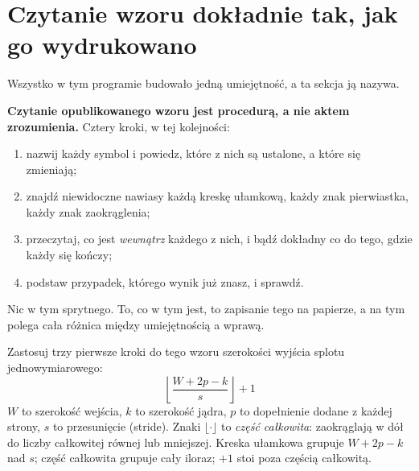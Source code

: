 \section{Czytanie wzoru dokładnie tak, jak go wydrukowano}
\label{sec:F02-reading}

\begin{fr}
Wszystko w tym programie budowało jedną umiejętność, a ta sekcja ją nazywa.

\textbf{Czytanie opublikowanego wzoru jest procedurą, a nie aktem
zrozumienia.} Cztery kroki, w tej kolejności:

\begin{enumerate}
\item nazwij każdy symbol i powiedz, które z nich są ustalone, a które się
  zmieniają;
\item znajdź niewidoczne nawiasy \dash{} każdą kreskę ułamkową, każdy znak
  pierwiastka, każdy znak zaokrąglenia;
\item przeczytaj, co jest \emph{wewnątrz} każdego z nich, i bądź dokładny co do
  tego, gdzie każdy się kończy;
\item podstaw przypadek, którego wynik już znasz, i sprawdź.
\end{enumerate}

Nic w tym sprytnego. To, co w tym jest, to zapisanie tego na papierze, a na tym
polega cała różnica między umiejętnością a wprawą.

Zastosuj trzy pierwsze kroki do tego wzoru \dash{} szerokości wyjścia splotu
jednowymiarowego:
\[ \left\lfloor \frac{W + 2p - k}{s} \right\rfloor + 1 \]
$W$ to szerokość wejścia, $k$ to szerokość jądra, $p$ to dopełnienie dodane z
każdej strony, $s$ to przesunięcie (stride). Znaki $\lfloor \cdot \rfloor$ to
\emph{część całkowita}: zaokrąglają w dół do liczby całkowitej równej lub
mniejszej. Kreska
ułamkowa grupuje $W + 2p - k$ nad $s$; część całkowita grupuje cały iloraz;
$+ 1$ stoi poza częścią całkowitą.
\end{fr}


